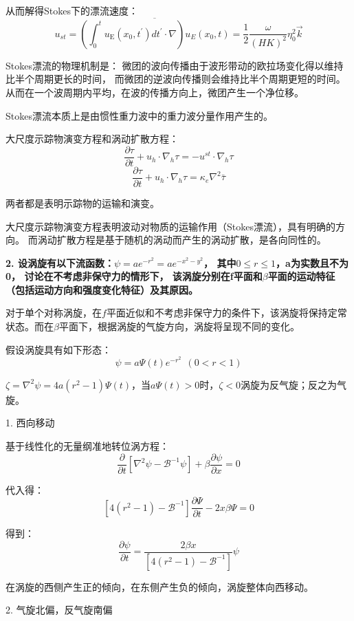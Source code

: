 \documentclass{article}
\begin{document}
从而解得Stokes下的漂流速度：
$$u_{st}=\overline{(\int_{0}^{t}{{{u}_{\text{E}}}({{x}_{0}},t^{\prime})}dt^{\prime}\cdot \nabla ){{u}_{E}}({{x}_{0}},t)} = \frac{1}{2}\frac{\omega}{(HK)^2}\eta_0^2\vec{k}$$

Stokes漂流的物理机制是：
微团的波向传播由于波形带动的欧拉场变化得以维持比半个周期更长的时间，
而微团的逆波向传播则会维持比半个周期更短的时间。
从而在一个波周期内平均，在波的传播方向上，微团产生一个净位移。

Stokes漂流本质上是由惯性重力波中的重力波分量作用产生的。

大尺度示踪物演变方程和涡动扩散方程：
$$\frac{\partial \tau }{\partial t}+{{u}_{h}}\cdot {{\nabla }_{h}}\tau 
=-{{u}^{st}}\cdot {{\nabla }_{h}}\tau$$
$$\frac{\partial \tau }{\partial t}+{{u}_{h}}\cdot {{\nabla }_{h}}\tau 
={{\kappa }_{e}}\nabla^2\bar{\tau }$$

两者都是表明示踪物的运输和演变。

大尺度示踪物演变方程表明波动对物质的运输作用（Stokes漂流），具有明确的方向。
而涡动扩散方程是基于随机的涡动而产生的涡动扩散，是各向同性的。


\textbf{2. 设涡旋有以下流函数：$\psi = ae^{-r^2} = ae^{-x^2-y^2}$，
其中$0\le r\le 1$，a为实数且不为0，
讨论在不考虑非保守力的情形下，
该涡旋分别在f平面和$\beta$平面的运动特征（包括运动方向和强度变化特征）及其原因。}

对于单个对称涡旋，在$f$平面近似和不考虑非保守力的条件下，该涡旋将保持定常状态。而在$\beta$平面下，根据涡旋的气旋方向，涡旋将呈现不同的变化。

假设涡旋具有如下形态：
$$\psi = a\Psi(t)e^{-r^2} \ \ (0<r<1)$$

$\zeta={{\nabla }}^{2}{{\psi }} = 4a(r^2-1)\Psi(t)$，当$a\Psi(t)>0$时，$\zeta<0$涡旋为反气旋；反之为气旋。

1. 西向移动

基于线性化的无量纲准地转位涡方程：
$$\frac{\partial }{\partial {{t}}}\left[ {{\nabla }}^{2}{{\psi }}-{\mathcal{B}^{-1}}{{\psi }} \right]+{{\beta }}\frac{\partial {{\psi }}}{\partial {{x}}}=0$$

代入得：
$$\left[ 4({{r}^{2}}-1)-{{\mathcal{B}}^{-1}} \right]\frac{\partial \Psi }{\partial t}-2x\beta \Psi =0$$

得到：
$$\frac{\partial \psi }{\partial t}=\frac{2\beta x}{\left[ 4({{r}^{2}}-1)-{{\mathcal{B}}^{-1}} \right]}\psi$$

在涡旋的西侧产生正的倾向，在东侧产生负的倾向，涡旋整体向西移动。

2. 气旋北偏，反气旋南偏 
\end{document}
